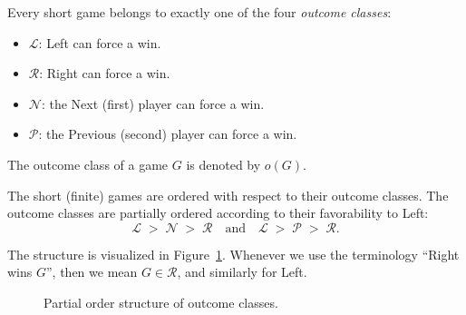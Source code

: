\documentclass[oneside,reqno]{amsart}
\newcommand{\rp}{\mathscr{R}}
\newcommand{\np}{\mathscr{N}}
\newcommand{\pp}{\mathscr{P}}
\begin{document}
    \begin{theorem}
        Every short game belongs to exactly one of the four \emph{outcome classes}:
        \begin{itemize}
            \item $\mathscr{L}$: Left can force a win.
            \item $\mathscr{R}$: Right can force a win.
            \item $\mathscr{N}$: the Next (first) player can force a win.
            \item $\mathscr{P}$: the Previous (second) player can force a win.
        \end{itemize}
        The outcome class of a game $G$ is denoted by $o(G)$.
    \end{theorem}

    
    The short (finite) games are ordered with respect to their outcome classes. 
    The outcome classes are partially ordered according to their favorability to Left:
    $$\mathscr{L} \;>\; \mathscr{N}\;>\;\mathscr{R}\quad \text{and}\quad \mathscr{L} \;>\;\mathscr{P} \;>\; \mathscr{R}.$$

    The structure is visualized  in Figure~\ref{fig: partial order structure}. Whenever we use the terminology ``Right wins $G$'', then we mean $G\in \rp$, and similarly for Left.

    \begin{figure}[h!]
        \centering
        \caption{Partial order structure of outcome classes.}
        \label{fig: partial order structure}
    \end{figure}
\end{document}
